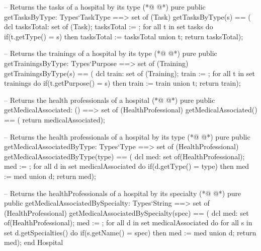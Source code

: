 \begin{vdmpp}[breaklines=true]
 -- Returns the tasks of a hospital by its type
(*@
\label{getTasksByType:126}
@*)
 pure public getTasksByType: Types`TaskType ==> set of (Task)
  getTasksByType(s) == (
   dcl tasksTotal: set of (Task);
   tasksTotal := {};
   for all t in set tasks do
    if(t.getType() = s)
     then tasksTotal := tasksTotal union {t};  
   return tasksTotal);
 
 -- Returns the trainings of a hospital by its type
(*@
\label{getTrainingsByType:136}
@*)
 pure public getTrainingsByType: Types`Purpose ==> set of (Training)
  getTrainingsByType(s) == (
   dcl train: set of (Training);
   train := {};
   for all t in set trainings do
    if(t.getPurpose() = s)
     then train := train union {t}; 
   return train);

 -- Returns the health professionals of a hospital
(*@
\label{getMedicalAssociated:146}
@*)
 pure public getMedicalAssociated: () ==> set of (HealthProfessional)
  getMedicalAssociated() == (
   return medicalAssociated);

 -- Returns the health professionals of a hospital by its type
(*@
\label{getMedicalAssociatedByType:151}
@*)
 pure public getMedicalAssociatedByType: Types`Type ==> set of (HealthProfessional)
  getMedicalAssociatedByType(type) == (
   dcl med: set of(HealthProfessional);
   med := {};
   for all d in set medicalAssociated do
    if(d.getType() = type)
     then med := med union {d};
   return med);
 
 -- Returns the healthProfessionals of a hospital by its specialty
(*@
\label{getMedicalAssociatedBySpecialty:161}
@*)
 pure public getMedicalAssociatedBySpecialty: Types`String ==> set of (HealthProfessional)
  getMedicalAssociatedBySpecialty(spec) == (
   dcl med: set of(HealthProfessional);
   med := {};
   for all d in set medicalAssociated do
    for all s in set d.getSpecialties() do
     if(s.getName() = spec)
      then med := med union {d};
   return med);
end Hospital
\end{vdmpp}
\bigskip
